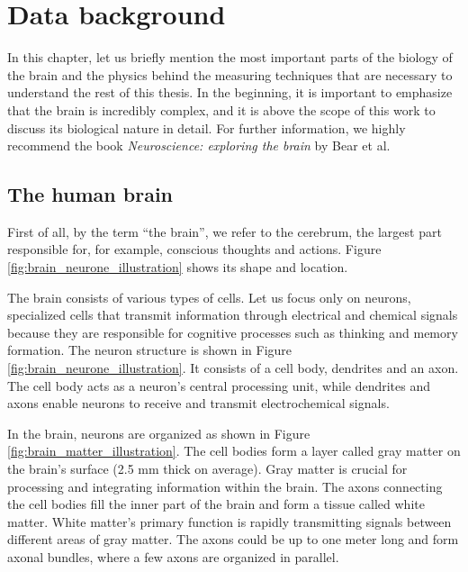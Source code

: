 \chapter{Data background}\label{ch:brain}

In this chapter, let us briefly mention the most important parts of the biology of the brain and the physics behind the measuring techniques that are necessary to understand the rest of this thesis. In the beginning, it is important to emphasize that the brain is incredibly complex, and it is above the scope of this work to discuss its biological nature in detail. For further information, we highly recommend the book \textit{Neuroscience: exploring the brain} by Bear et al. \cite{bear_neuroscience_2016}

\section{The human brain}

First of all, by the term \enquote{the brain}, we refer to the cerebrum, the largest part responsible for, for example, conscious thoughts and actions. Figure \ref{fig:brain_neurone_illustration} shows its shape and location.

The brain consists of various types of cells. Let us focus only on neurons, specialized cells that transmit information through electrical and chemical signals because they are responsible for cognitive processes such as thinking and memory formation. The neuron structure is shown in Figure \ref{fig:brain_neurone_illustration}. It consists of a cell body, dendrites and an axon. The cell body acts as a neuron's central processing unit, while dendrites and axons enable neurons to receive and transmit electrochemical signals. 

In the brain, neurons are organized as shown in Figure \ref{fig:brain_matter_illustration}. The cell bodies form a layer called gray matter on the brain's surface (2.5 mm thick on average). Gray matter is crucial for processing and integrating information within the brain. The axons connecting the cell bodies fill the inner part of the brain and form a tissue called white matter. White matter's primary function is rapidly transmitting signals between different areas of gray matter. The axons could be up to one meter long and form axonal bundles, where a few axons are organized in parallel. \cite{bear_neuroscience_2016}

\newpage

